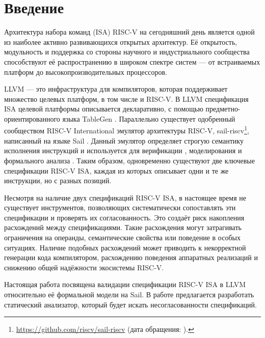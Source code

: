 
\section*{Введение}
\thispagestyle{withCompileDate}

Архитектура набора команд (ISA) RISC-V \cite{waterman2014risc} на сегодняшний день является одной из наиболее активно развивающихся открытых архитектур.
Её открытость, модульность и поддержка со стороны научного и индустриального сообщества способствуют её распространению в широком спектре систем --- от встраиваемых платформ до высокопроизводительных процессоров.

LLVM \cite{lattner2004llvm} --- это инфраструктура для компиляторов, которая поддерживает множество целевых платформ, в том числе и RISC-V.
В LLVM спецификация ISA целевой платформы описывается декларативно, с помощью предметно-ориентированного языка TableGen \cite{tblgen}.
Параллельно существует одобренный сообществом RISC-V International эмулятор архитектуры RISC-V, sail-riscv\footnote{\url{https://github.com/riscv/sail-riscv} (дата обращения: ).}, написанный на языке Sail \cite{gray2017sail}.
Данный эмулятор определяет строгую семантику исполнения инструкций и используется для верификации \cite{sammler2022islaris}, моделирования и формального анализа \cite{armstrong2018detailed}.
Таким образом, одновременно существуют две ключевые спецификации RISC-V ISA, каждая из которых описывает одни и те же инструкции, но с разных позиций.

Несмотря на наличие двух спецификаций RISC-V ISA, в настоящее время не существует инструментов, позволяющих систематически сопоставлять эти спецификации и проверять их согласованность.
Это создаёт риск накопления расхождений между спецификациями.
Такие расхождения могут затрагивать ограничения на операнды, семантические свойства или поведение в особых ситуациях.
Наличие подобных расхождений может приводить к некорректной генерации кода компилятором, расхождению поведения аппаратных реализаций и снижению общей надёжности экосистемы RISC-V.

Настоящая работа посвящена валидации спецификации RISC-V ISA в LLVM относительно её формальной модели на Sail.
В работе предлагается разработать статический анализатор, который будет искать несогласованности спецификаций.


